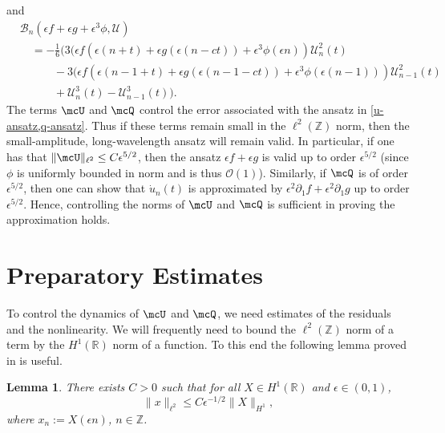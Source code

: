 \documentclass[oneside,reqno]{amsart}
\newcommand{\Z}{\mathbb{Z}}
\newcommand{\R}{\mathbb{R}}
\newtheorem{lem}{Lemma}[section]
\begin{document}
and 
\begin{equation*}
	\begin{aligned}
		&\mathcal B_n(\epsilon f + \epsilon g + \epsilon^3 \phi, \mathcal U) \\
		&\quad= -\frac 1 6 \Big( 3(\epsilon f(\epsilon(n+t) + \epsilon g(\epsilon(n-ct)) + \epsilon^3 \phi(\epsilon n))  \mathcal U^2_n(t) \\
		&\quad \qquad - 3(\epsilon f(\epsilon(n-1+t) + \epsilon g(\epsilon(n-1-ct)) + \epsilon^3 \phi(\epsilon (n-1)))  \mathcal U^2_{n-1}(t) \\
		&\quad\qquad + \mathcal U_n^3(t)  - \mathcal U_{n-1}^3(t)\Big).
	\end{aligned}
\end{equation*}
The terms \(\mcU\) and \(\mcQ\) control the error associated with the ansatz in \cref{u-ansatz,q-ansatz}. Thus if these terms remain small in the \(\ell^2(\Z)\) norm, then the small-amplitude, long-wavelength ansatz will remain valid. In particular, if one has that \(\|\mcU\|_{\ell^2} \leq C\epsilon^{5/2}\), then the ansatz \(\epsilon f + \epsilon g\) is valid up to order \(\epsilon^{5/2}\) (since \(\phi\) is uniformly bounded in norm and is thus \(\mathcal O (1)\)). Similarly, if \(\mcQ\) is of order \(\epsilon^{5/2}\), then one can show that \(\dot u_n(t)\) is approximated by \(\epsilon^2 \partial_1 f + \epsilon^2 \partial_1 g\) up to order \(\epsilon^{5/2}\). Hence, controlling the norms of \(\mcU\) and \(\mcQ\) is sufficient in proving the approximation holds.

\section{Preparatory Estimates}\label{sec:estimates}

To control the dynamics of \(\mcU\) and \(\mcQ\), we need estimates of the residuals and the nonlinearity. We will frequently need to bound the \(\ell^2(\Z)\) norm of a term by the \(H^1(\R)\) norm of a function. To this end the following lemma proved in \cite{dumas2014justification} is useful.
\begin{lem}\label{h1-ell2-ineq}
	There exists \(C>0\) such that for all \(X \in H^1(\R)\) and \(\epsilon \in (0,1)\), \[\|x\|_{\ell^2} \leq C \epsilon^{-1/2} \|X\|_{H^1},\] where \(x_n := X(\epsilon n)\), \(n\in \mathbb Z\).
\end{lem}
\end{document}
